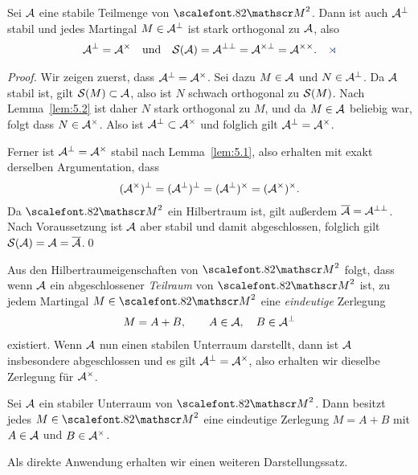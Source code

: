 \begin{theorem}
\label{prop:5.3}
Sei $\AA$ eine stabile Teilmenge von $\MM^2$. Dann ist auch $\AA^\perp$ stabil
und jedes Martingal $M\in \AA^\perp$ ist stark orthogonal zu $\AA$, also
\begin{align*}
\AA^\perp = \AA^\times \quad \text{und} \quad \SS(\AA)=\AA^{
\perp\perp} =
\AA^{\times\perp} = \AA^{\times\times}.\fish
\end{align*}
\end{theorem}
\begin{proof}
Wir zeigen zuerst, dass $\AA^\perp = \AA^\times$. Sei dazu $M\in\AA$ und
$N\in\AA^\bot$. Da $\AA$ stabil ist, gilt $\SS(M)\subset \AA$, also ist $N$
schwach orthogonal zu $\SS(M)$. Nach Lemma~\ref{lem:5.2} ist daher $N$ stark
orthogonal zu $M$, und da $M\in\AA$ beliebig war, folgt dass $N\in\AA^\times$.
Also ist $\AA^{\perp} \subset \AA^\times$ und folglich gilt $\AA^\perp =
\AA^\times$.

Ferner ist $\AA^\perp=\AA^\times$ stabil nach Lemma~\ref{lem:5.1}, also erhalten
mit exakt derselben Argumentation, dass
\begin{align*}
(\AA^\times)^\perp  = (\AA^\perp)^\perp = (\AA^\perp)^\times =
(\AA^\times)^\times.
\end{align*}
Da $\MM^2$ ein Hilbertraum ist, gilt außerdem $\bar{\AA} = \AA^{\perp\perp}$.
Nach Voraussetzung ist $\AA$ aber stabil und damit abgeschlossen, folglich gilt
$\SS(\AA) = \AA = \bar{\AA}$.\qed
\end{proof}


Aus den Hilbertraumeigenschaften von $\MM^2$ folgt, dass wenn $\AA$ ein
abgeschlossener \textit{Teilraum} von $\MM^2$ ist, zu jedem Martingal
$M\in\MM^2$ eine \textit{eindeutige} Zerlegung
\begin{align*}
M = A + B,\qquad A\in\AA,\quad B\in\AA^\perp
\end{align*}
existiert. Wenn $\AA$ nun einen stabilen Unterraum darstellt, dann ist $\AA$
insbesondere abgeschlossen und es gilt $\AA^\perp = \AA^\times$, also erhalten
wir dieselbe Zerlegung für $\AA^\times$.

\begin{korollar}
\label{cor:5.1}
Sei $\AA$ ein stabiler Unterraum von $\MM^2$. Dann besitzt jedes $M\in
\MM^2$ eine eindeutige Zerlegung $M=A+B$ mit $A\in\AA$ und
$B\in\AA^\times$.\fish
\end{korollar}

Als direkte Anwendung erhalten wir einen weiteren Darstellungssatz.


